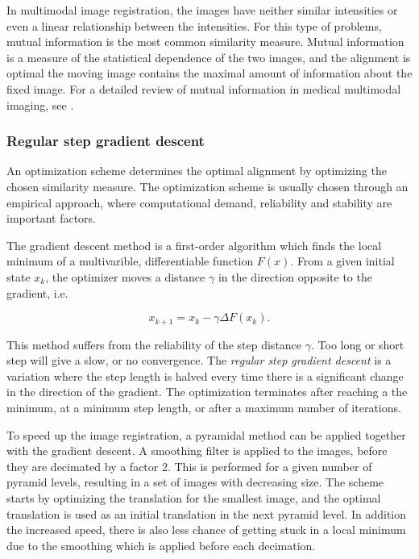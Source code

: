 In multimodal image registration, the images have neither similar intensities or even a linear relationship between the intensities. For this type of problems, mutual information is the most common similarity measure. Mutual information is a measure of the statistical dependence of the two images, and the alignment is optimal the moving image contains the maximal amount of information about the fixed image. For a detailed review of mutual information in medical multimodal imaging, see \cite{563664}.  

\subsubsection{Regular step gradient descent}
An optimization scheme determines the optimal alignment by optimizing the chosen similarity measure. The optimization scheme is usually chosen through an empirical approach, where computational demand, reliability and stability are important factors. 

The gradient descent method is a first-order algorithm which finds the local minimum of a multivarible, differentiable function $F(x)$. From a given initial state $x_k$, the optimizer moves a distance $\gamma$ in the direction opposite to the gradient, i.e.

\begin{equation}
\label{gradient descent}
x_{k+1} = x_k - \gamma \Delta F(x_k).
\end{equation}

This method suffers from the reliability of the step distance $\gamma$. Too long or short step will give a slow, or no convergence. The \textit{regular step gradient descent} is a variation where the step length is halved every time there is a significant change in the direction of the gradient. The optimization terminates after reaching a the minimum, at a minimum step length, or after a maximum number of iterations.

To speed up the image registration, a pyramidal method can be applied together with the gradient descent. A smoothing filter is applied to the images, before they are decimated by a factor 2. This is performed for a given number of pyramid levels, resulting in a set of images with decreasing size. The scheme starts by optimizing the translation for the smallest image, and the optimal translation is used as an initial translation in the next pyramid level. In addition the increased speed, there is also less chance of getting stuck in a local minimum due to the smoothing which is applied before each decimation.
 
